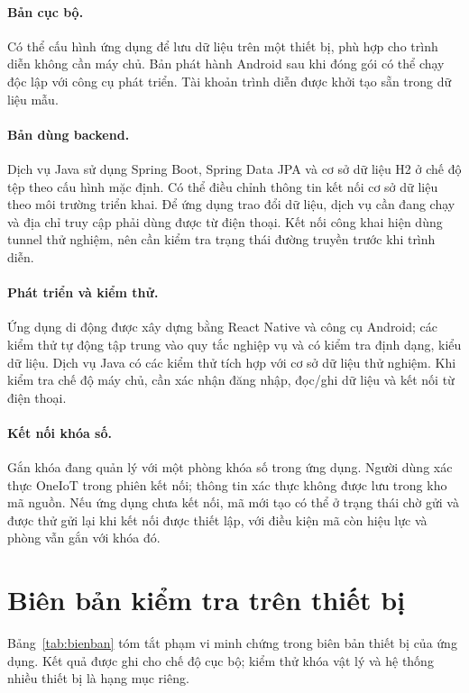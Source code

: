 \documentclass[../DoAn.tex]{subfiles}
\begin{document}
\paragraph{Bản cục bộ.} Có thể cấu hình ứng dụng để lưu dữ liệu trên một thiết bị, phù hợp cho trình diễn không cần máy chủ. Bản phát hành Android sau khi đóng gói có thể chạy độc lập với công cụ phát triển. Tài khoản trình diễn được khởi tạo sẵn trong dữ liệu mẫu.

\paragraph{Bản dùng backend.} Dịch vụ Java sử dụng Spring Boot, Spring Data JPA và cơ sở dữ liệu H2 ở chế độ tệp theo cấu hình mặc định. Có thể điều chỉnh thông tin kết nối cơ sở dữ liệu theo môi trường triển khai. Để ứng dụng trao đổi dữ liệu, dịch vụ cần đang chạy và địa chỉ truy cập phải dùng được từ điện thoại. Kết nối công khai hiện dùng tunnel thử nghiệm, nên cần kiểm tra trạng thái đường truyền trước khi trình diễn.

\paragraph{Phát triển và kiểm thử.} Ứng dụng di động được xây dựng bằng React Native và công cụ Android; các kiểm thử tự động tập trung vào quy tắc nghiệp vụ và có kiểm tra định dạng, kiểu dữ liệu. Dịch vụ Java có các kiểm thử tích hợp với cơ sở dữ liệu thử nghiệm. Khi kiểm tra chế độ máy chủ, cần xác nhận đăng nhập, đọc/ghi dữ liệu và kết nối từ điện thoại.

\paragraph{Kết nối khóa số.} Gắn khóa đang quản lý với một phòng khóa số trong ứng dụng. Người dùng xác thực OneIoT trong phiên kết nối; thông tin xác thực không được lưu trong kho mã nguồn. Nếu ứng dụng chưa kết nối, mã mới tạo có thể ở trạng thái chờ gửi và được thử gửi lại khi kết nối được thiết lập, với điều kiện mã còn hiệu lực và phòng vẫn gắn với khóa đó.

\section{Biên bản kiểm tra trên thiết bị}
Bảng~\ref{tab:bienban} tóm tắt phạm vi minh chứng trong biên bản thiết bị của ứng dụng. Kết quả được ghi cho chế độ cục bộ; kiểm thử khóa vật lý và hệ thống nhiều thiết bị là hạng mục riêng.
\end{document}
